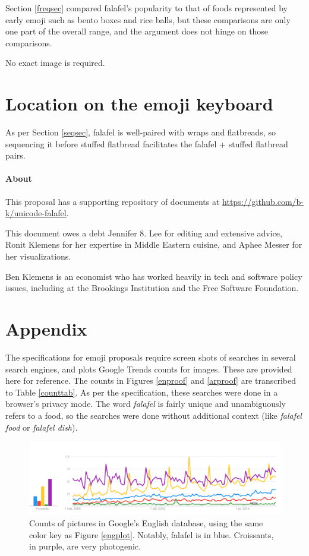 \documentclass[a4paper,10pt]{article}
\begin{document}
Section \ref{freqsec} compared falafel's popularity to that of foods represented by early
emoji such as bento boxes and rice balls, but these comparisons are only one part of the
overall range, and the argument does not hinge on those comparisons.

No exact image is required.

\section{Location on the emoji keyboard}

As per Section \ref{seqsec}, falafel is well-paired with wraps and flatbreads, so 
sequencing it before {\sc stuffed flatbread}
facilitates the {\sc falafel} + {\sc stuffed flatbread} pairs.

\vfill
{\small \paragraph{About}
This proposal has a supporting repository of documents at 
\url{https://github.com/b-k/unicode-falafel}.

This document owes a debt Jennifer 8. Lee for editing and extensive
advice, Ronit Klemens for her expertise in Middle Eastern cuisine,
and Aphee Messer for her visualizations.

Ben Klemens is an economist who has worked heavily in tech and software policy issues,
including at the Brookings Institution and the Free Software Foundation.
}

\eject
\section*{Appendix}
The specifications for emoji proposals require screen shots of searches in several
search engines, and plots Google Trends counts for images. These are provided here
for reference. The counts in Figures \ref{enproof} and \ref{arproof} are transcribed
to Table \ref{counttab}. As per the specification, these searches were done
in a browser's privacy mode. The word {\em falafel} is fairly unique and unambiguously
refers to a food, so the searches were done without additional context (like {\em
falafel food} or {\em falafel dish}).


\begin{figure}[!hb]
\begin{center}
\includegraphics[width=4.8in]{etrends-pics.png}
\end{center}
\caption{Counts of pictures in Google's English database, using the same color key as
Figure \ref{engplot}. Notably, falafel is in blue. Croissants, in purple, are very photogenic.}
\label{engpicplot}
\end{figure}
\end{document}
